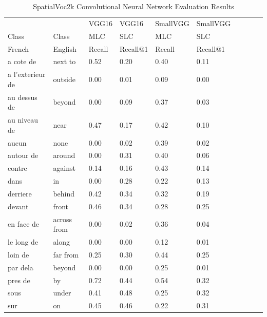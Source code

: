 \documentclass{IEEEtran}
\begin{document}
\begin{table}[!htbp]
\caption{SpatialVoc2k Convolutional Neural Network Evaluation Results}
\centering
\begin{tabular}{|l|l|l|l|l|l|l|l|l|l}
\cline{1-6}
	  			  & 	  			  & VGG16 		& VGG16    & SmallVGG & SmallVGG  \\ \cline{1-6}
Class 			  &  Class 			  & MLC   		& SLC  	   & MLC      & SLC       \\ \cline{1-6}
French            & English           &  Recall     & Recall@1 &  Recall  & Recall@1  \\ \cline{1-6}
a cote de	      &	next to           &	0.52		&	0.20   &	0.40  &	0.11      \\ \cline{1-6}
a l'exterieur de  &	outside	          &	0.00		&	0.01   &	0.09  &	0.00	  \\ \cline{1-6}
au dessus de	  &	beyond		      &	0.00		&	0.09   &	0.37  &	0.03	  \\ \cline{1-6}
au niveau de	  &	near		      &	0.47	    &	0.17   &	0.42  &	0.10	  \\ \cline{1-6}
aucun	          &	 none		  	  &	0.00		&	0.02   &	0.39  &	0.02	  \\ \cline{1-6} 
autour de	      &	around		      &	0.00		&	0.31   &	0.40  &	0.06	  \\ \cline{1-6}
contre			  &	against		      &	0.14	    &	0.16   &	0.43  &	0.14	  \\ \cline{1-6}
dans			  &	in				  &	0.00     	&	0.28   &	0.22  &	0.13  	  \\ \cline{1-6}
derriere		  &	behind		      &	0.42		&	0.34   &	0.32  &	0.19      \\ \cline{1-6}
devant			  &	front		      &	0.46		&	0.34   &	0.28  &	0.25      \\ \cline{1-6} 
en face de		  & across from		  &	0.00		&	0.02   &	0.36  &	0.04	  \\ \cline{1-6} 
le long de	      &	along 		      & 0.00		&   0.00   &	0.12  &	0.01 	  \\ \cline{1-6} 
loin de			  &	far from		  &	0.25		&	0.30   &	0.44  &	0.25	  \\ \cline{1-6}
par dela	      &	beyond	          & 0.00	    &	0.00   &	0.25  &	0.01      \\ \cline{1-6}
pres de			  &	by		          &	0.72		&	0.44   &	0.54  &	0.32	  \\ \cline{1-6}
sous		   	  &	under	          &	0.41	    &	0.48   &	0.25  &	0.32 	  \\ \cline{1-6}
sur				  &	on			      &	0.45	    &	0.46   &	0.22  &	0.31	  \\ \cline{1-6}

\end{tabular}
\end{table}
\end{document}
